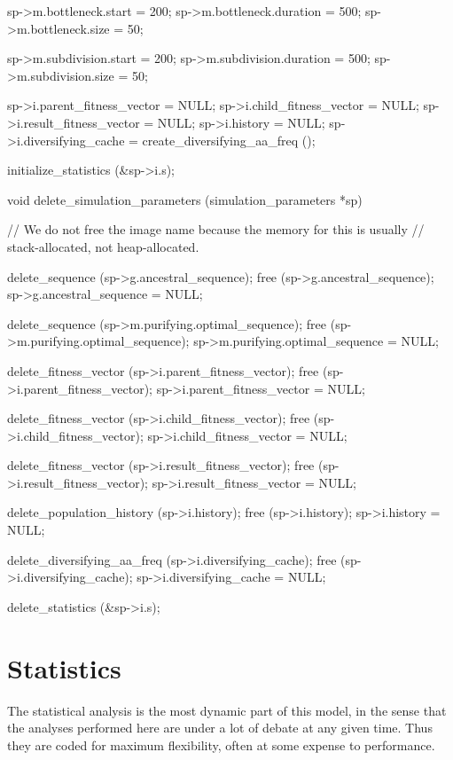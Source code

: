 \documentclass{article}
\begin{document}
\begin{ccode}
{  sp->m.bottleneck.start			= 200;
  sp->m.bottleneck.duration			= 500;
  sp->m.bottleneck.size				= 50;

  sp->m.subdivision.start			= 200;
  sp->m.subdivision.duration			= 500;
  sp->m.subdivision.size			= 50;

  sp->i.parent_fitness_vector			= NULL;
  sp->i.child_fitness_vector			= NULL;
  sp->i.result_fitness_vector			= NULL;
  sp->i.history					= NULL;
  sp->i.diversifying_cache			= create_diversifying_aa_freq ();

  initialize_statistics	(&sp->i.s);
}

void delete_simulation_parameters (simulation_parameters *sp) {
  // We do not free the image name because the memory for this is usually
  // stack-allocated, not heap-allocated.

  delete_sequence (sp->g.ancestral_sequence);
  free (sp->g.ancestral_sequence);
  sp->g.ancestral_sequence = NULL;

  delete_sequence (sp->m.purifying.optimal_sequence);
  free (sp->m.purifying.optimal_sequence);
  sp->m.purifying.optimal_sequence = NULL;

  delete_fitness_vector (sp->i.parent_fitness_vector);
  free (sp->i.parent_fitness_vector);
  sp->i.parent_fitness_vector = NULL;

  delete_fitness_vector (sp->i.child_fitness_vector);
  free (sp->i.child_fitness_vector);
  sp->i.child_fitness_vector = NULL;

  delete_fitness_vector (sp->i.result_fitness_vector);
  free (sp->i.result_fitness_vector);
  sp->i.result_fitness_vector = NULL;

  delete_population_history (sp->i.history);
  free (sp->i.history);
  sp->i.history = NULL;

  delete_diversifying_aa_freq (sp->i.diversifying_cache);
  free (sp->i.diversifying_cache);
  sp->i.diversifying_cache = NULL;

  delete_statistics (&sp->i.s);
}
\end{ccode}

  \section{Statistics}
    \label{sec:statistics}

    The statistical analysis is the most dynamic part of this model, in the
    sense that the analyses performed here are under a lot of debate at any
    given time. Thus they are coded for maximum flexibility, often at some
    expense to performance.
\end{document}
